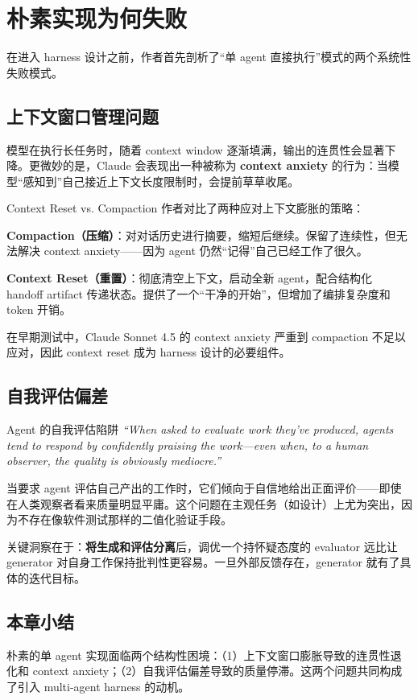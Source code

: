 \section{朴素实现为何失败}

在进入 harness 设计之前，作者首先剖析了``单 agent 直接执行''模式的两个系统性失败模式。

\subsection{上下文窗口管理问题}

模型在执行长任务时，随着 context window 逐渐填满，输出的连贯性会显著下降。更微妙的是，Claude 会表现出一种被称为 \textbf{context anxiety} 的行为：当模型``感知到''自己接近上下文长度限制时，会提前草草收尾。

\begin{knowledgebox}{Context Reset vs. Compaction}
作者对比了两种应对上下文膨胀的策略：

\textbf{Compaction（压缩）}：对对话历史进行摘要，缩短后继续。保留了连续性，但无法解决 context anxiety——因为 agent 仍然``记得''自己已经工作了很久。

\textbf{Context Reset（重置）}：彻底清空上下文，启动全新 agent，配合结构化 handoff artifact 传递状态。提供了一个``干净的开始''，但增加了编排复杂度和 token 开销。

在早期测试中，Claude Sonnet 4.5 的 context anxiety 严重到 compaction 不足以应对，因此 context reset 成为 harness 设计的必要组件。
\end{knowledgebox}

\subsection{自我评估偏差}

\begin{warningbox}{Agent 的自我评估陷阱}
\textit{``When asked to evaluate work they've produced, agents tend to respond by confidently praising the work—even when, to a human observer, the quality is obviously mediocre.''}

当要求 agent 评估自己产出的工作时，它们倾向于自信地给出正面评价——即使在人类观察者看来质量明显平庸。这个问题在主观任务（如设计）上尤为突出，因为不存在像软件测试那样的二值化验证手段。
\end{warningbox}

关键洞察在于：\textbf{将生成和评估分离}后，调优一个持怀疑态度的 evaluator 远比让 generator 对自身工作保持批判性更容易。一旦外部反馈存在，generator 就有了具体的迭代目标。

\subsection{本章小结}

朴素的单 agent 实现面临两个结构性困境：（1）上下文窗口膨胀导致的连贯性退化和 context anxiety；（2）自我评估偏差导致的质量停滞。这两个问题共同构成了引入 multi-agent harness 的动机。


